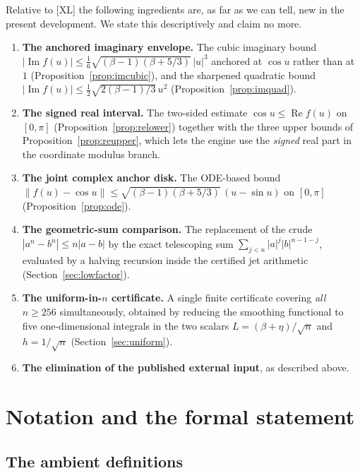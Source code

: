 \documentclass[11pt,a4paper]{article}
\theoremstyle{definition}
\begin{document}
Relative to [XL] the following ingredients are, as far as we can tell, new in the
present development. We state this descriptively and claim no more.

\begin{enumerate}[label=(\alph*),leftmargin=2.2em]
\item \textbf{The anchored imaginary envelope.} The cubic imaginary bound
  $|\operatorname{Im}f(u)|\le\tfrac16\sqrt{(\beta-1)(\beta+5/3)}\,|u|^3$
  anchored at $\cos u$ rather than at~$1$
  (Proposition~\ref{prop:imcubic}), and the sharpened quadratic bound
  $|\operatorname{Im}f(u)|\le\tfrac12\sqrt{2(\beta-1)/3}\,u^2$
  (Proposition~\ref{prop:imquad}).
\item \textbf{The signed real interval.} The two-sided estimate
  $\cos u\le\operatorname{Re}f(u)$ on $[0,\pi]$
  (Proposition~\ref{prop:relower}) together with the three upper bounds of
  Proposition~\ref{prop:reupper}, which lets the engine use the
  \emph{signed} real part in the coordinate modulus branch.
\item \textbf{The joint complex anchor disk.} The ODE-based bound
  $\|f(u)-\cos u\|\le\sqrt{(\beta-1)(\beta+5/3)}\,(u-\sin u)$ on $[0,\pi]$
  (Proposition~\ref{prop:ode}).
\item \textbf{The geometric-sum comparison.} The replacement of the crude
  $|a^n-b^n|\le n|a-b|$ by the exact telescoping sum
  $\sum_{j<n}|a|^j|b|^{n-1-j}$, evaluated by a halving recursion inside the
  certified jet arithmetic (Section~\ref{sec:lowfactor}).
\item \textbf{The uniform-in-$n$ certificate.} A single finite certificate
  covering \emph{all} $n\ge256$ simultaneously, obtained by reducing the
  smoothing functional to five one-dimensional integrals in the two scalars
  $L=(\beta+\eta)/\sqrt n$ and $h=1/\sqrt n$ (Section~\ref{sec:uniform}).
\item \textbf{The elimination of the published external input}, as described
  above.
\end{enumerate}

\section{Notation and the formal statement}
\label{sec:notation}

\subsection{The ambient definitions}
\end{document}
